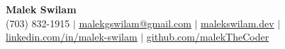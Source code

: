 \begin{center}
    \textbf{\Huge Malek Swilam} \\ \vspace{2pt}
    \small
    (703) 832-1915 $|$
    \href{mailto:malekgswilam@gmail.com}{\underline{malekgswilam@gmail.com}} $|$
    \href{https://malekswilam.dev}{\underline{malekswilam.dev}} $|$
    \href{https://linkedin.com/in/malek-swilam}{\underline{linkedin.com/in/malek-swilam}} $|$
    \href{https://github.com/malekTheCoder}{\underline{github.com/malekTheCoder}}
\end{center}
\vspace{-12pt}

